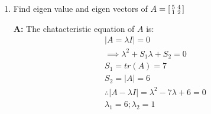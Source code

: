 \documentclass[english,course,fleqn]{lecture}
\newenvironment{qanda}{\begin{enumerate}\setlength{\parindent}{0pt}}{\medskip\end{enumerate}}
\newcommand{\Q}{\bigskip\bfseries \item}
\newcommand{\A}{\par\textbf{A:} \normalfont}
\begin{document}
\begin{qanda}
  \Q Find eigen value and eigen vectors of $A = \begin{bsmallmatrix}
    5 & 4 \\
    1 & 2 \\
  \end{bsmallmatrix}$

  \A The chatacteristic equation of $A$ is:
  \begin{gather*}
    |A = \lambda I| = 0\\
    \implies \lambda^{2} + S_{1} \lambda + S_{2} = 0\\
    S_{1} = tr(A) = 7\\
    S_{2} = |A| = 6
    \\
    \therefore |A - \lambda I| = \lambda^{2} - 7 \lambda + 6 = 0\\
    \lambda_{1} = 6;\lambda_{2} = 1
  \end{gather*}


\end{qanda}
\end{document}
